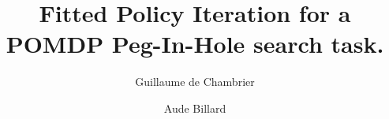 \documentclass[final,5p,times,twocolumn]{elsarticle}
\begin{document}
\begin{frontmatter}



\title{Fitted Policy Iteration for a POMDP Peg-In-Hole search task.}



\author[rvt]{Guillaume de Chambrier}

\author[rvt]{Aude Billard}


\address[rvt]{Learning Algorithms and Systems Laboratory (LASA), \'Ecole Polytechnique F\'ed\'erale de Lausanne (EPFL), Switzerland}

\address{}



\end{frontmatter}
\end{document}
